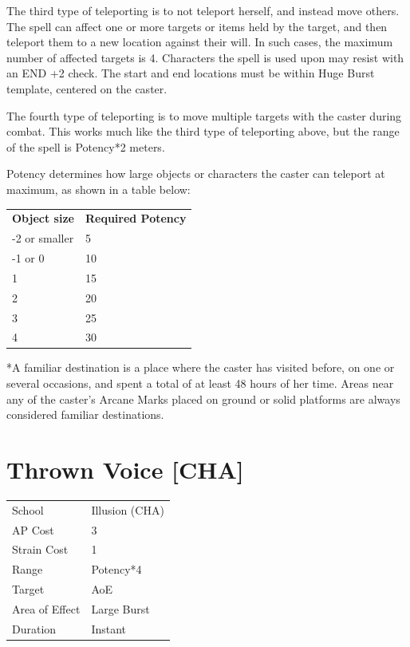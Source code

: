 \documentclass[11pt,a4paper,twocolumn]{book}
\begin{document}
The third type of teleporting is to not teleport herself, and instead move others. The spell can affect one or more targets or items held by the target, and then teleport them to a new location against their will. In such cases, the maximum number of affected targets is 4. Characters the spell is used upon may resist with an END +2 check. The start and end locations must be within Huge Burst template, centered on the caster.

\medskip

The fourth type of teleporting is to move multiple targets with the caster during combat. This works much like the third type of teleporting above, but the range of the spell is Potency*2 meters.

Potency determines how large objects or characters the caster can teleport at maximum, as shown in a table below:

\medskip
{
	\begin{tabu} to 75mm{| X[l,7] | X[l,7] |}
		\hline
		\textbf{Object size} 			&\textbf{Required Potency} 			\\
       -2 or smaller					& 5									\\
       -1 or 0     						& 10								\\ 
       1 								& 15								\\
       2								& 20								\\
       3								& 25								\\
       4								& 30								\\ \hline
	\end{tabu}
		
}
\medskip

*A familiar destination is a place where the caster has visited before, on one or several occasions, and spent a total of at least 48 hours of her time. Areas near any of the caster's Arcane Marks placed on ground or solid platforms are always considered familiar destinations.


\section*{Thrown Voice [CHA]}
{
	\begin{tabu} to 75mm{| X[l,4] | X[l,7] |}
		\hline
		School 			& Illusion (CHA) 				\\
        AP Cost	      	& 3								\\
        Strain Cost     & 1 							\\
        Range     		& Potency*4 					\\
        Target      	& AoE							\\
        Area of Effect  & Large Burst 	 				\\
        Duration     	& Instant						\\ \hline
	\end{tabu}
		
}
\end{document}
